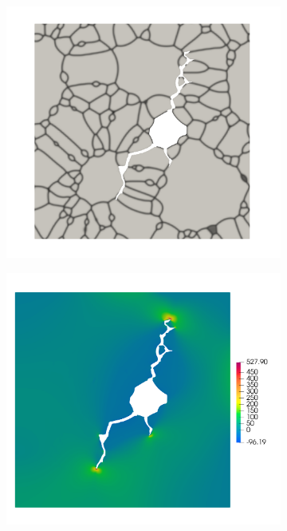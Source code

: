 \begin{frame}
\begin{columns}[T]
\begin{column}{0.4\textwidth}
\begin{figure}
        \begin{subfigure}[t]{0.47\linewidth}
          \centering
          \includegraphics[width=0.9\linewidth,scale=0.3]{Chapter345/figures/partial_hbs_2}
        \end{subfigure}
        \begin{subfigure}[t]{0.47\linewidth}
          \centering
          \includegraphics[width=0.9\linewidth,scale=0.3]{Chapter345/figures/partial_hbs_2_stress}
        \end{subfigure}
        

\end{figure}
\end{column}
\end{columns}
\end{frame}
